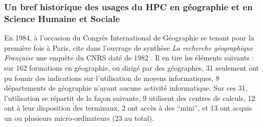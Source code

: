


\subsubsection{Un bref historique des usages du HPC en géographie et en Science Humaine et Sociale}
\label{sssec:histo_centrecalcul}



En 1984, à l'occasion du Congrès International de Géographie se tenant pour la première fois à Paris, \textcite{Faugieres1984} cite dans l'ouvrage de synthèse \textit{La recherche géographique Française} une enquête du CNRS daté de 1982 . Il en tire les éléments suivants : sur 162 formations en géographie, ou dirigé par des géographes, 31 seulement ont pu founir des indications sur l'utilisation de moyens informatiques, 8 départements de géographie n'ayant aucune activité informatique. Sur ces 31, l'utilisation se répartit de la façon suivante, 9 utilisent des centres de calculs, 12 ont à leur disposition des terminaux, 2 ont accès à des \enquote{mini}, et 13 ont acquis un ou plusieurs micro-ordinateurs (23 au total).

